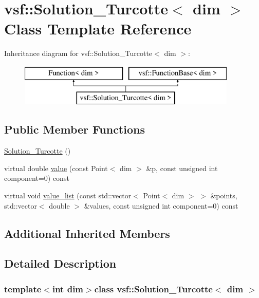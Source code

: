 \hypertarget{classvsf_1_1Solution__Turcotte}{\section{vsf\-:\-:Solution\-\_\-\-Turcotte$<$ dim $>$ Class Template Reference}
\label{classvsf_1_1Solution__Turcotte}
}
Inheritance diagram for vsf\-:\-:Solution\-\_\-\-Turcotte$<$ dim $>$\-:\begin{figure}[H]
\begin{center}
\leavevmode
\includegraphics[height=2.000000cm]{classvsf_1_1Solution__Turcotte}
\end{center}
\end{figure}
\subsection*{Public Member Functions}
\begin{DoxyCompactItemize}
\item 
\hyperlink{classvsf_1_1Solution__Turcotte_a30c7ada8fc223741d07f3e4f5f15f6be}{Solution\-\_\-\-Turcotte} ()
\item 
virtual double \hyperlink{classvsf_1_1Solution__Turcotte_a14a3516d1011ab7cb0bbc9e95ba281f2}{value} (const Point$<$ dim $>$ \&p, const unsigned int component=0) const 
\item 
virtual void \hyperlink{classvsf_1_1Solution__Turcotte_a1208e498d2ce30b41a47ebe2d8c8c058}{value\-\_\-list} (const std\-::vector$<$ Point$<$ dim $>$ $>$ \&points, std\-::vector$<$ double $>$ \&values, const unsigned int component=0) const 
\end{DoxyCompactItemize}
\subsection*{Additional Inherited Members}


\subsection{Detailed Description}
\subsubsection*{template$<$int dim$>$class vsf\-::\-Solution\-\_\-\-Turcotte$<$ dim $>$}

